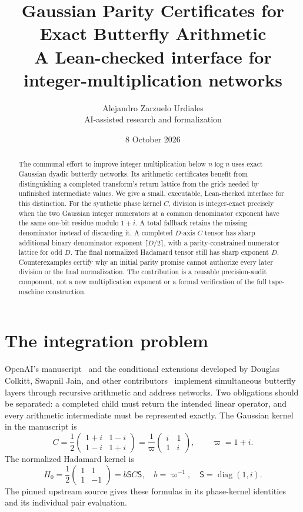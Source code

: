 \documentclass[11pt]{article}
\title{Gaussian Parity Certificates for Exact Butterfly Arithmetic\\
\large A Lean-checked interface for integer-multiplication networks}
\author{Alejandro Zarzuelo Urdiales\\\small AI-assisted research and formalization}
\date{8 October 2026}
\theoremstyle{definition}\newtheorem{definition}[theorem]{Definition}
\theoremstyle{remark}\newtheorem{remark}[theorem]{Remark}
\newcommand{\p}{\varpi}
\begin{document}
\maketitle
\begin{abstract}
The communal effort to improve integer multiplication below $n\log n$ uses exact Gaussian dyadic butterfly networks. Its arithmetic certificates benefit from distinguishing a completed transform's return lattice from the grids needed by unfinished intermediate values. We give a small, executable, Lean-checked interface for this distinction. For the synthetic phase kernel $C$, division is integer-exact precisely when the two Gaussian integer numerators at a common denominator exponent have the same one-bit residue modulo $1+i$. A total fallback retains the missing denominator instead of discarding it. A completed $D$-axis $C$ tensor has sharp additional binary denominator exponent $\lceil D/2\rceil$, with a parity-constrained numerator lattice for odd $D$. The final normalized Hadamard tensor still has sharp exponent $D$. Counterexamples certify why an initial parity promise cannot authorize every later division or the final normalization. The contribution is a reusable precision-audit component, not a new multiplication exponent or a formal verification of the full tape-machine construction.
\end{abstract}

\section{The integration problem}
OpenAI's manuscript~\cite{openai} and the conditional extensions developed by Douglas Colkitt, Swapnil Jain, and other contributors~\cite{colkitt,jain,chen} implement simultaneous butterfly layers through recursive arithmetic and address networks. Two obligations should be separated: a completed child must return the intended linear operator, and every arithmetic intermediate must be represented exactly. The Gaussian kernel in the manuscript is
\begin{equation}\label{eq:C}
 C=\frac12\begin{pmatrix}1+i&1-i\\1-i&1+i\end{pmatrix}
   =\frac1\p\begin{pmatrix}i&1\\1&i\end{pmatrix},\qquad \p=1+i.
\end{equation}
The normalized Hadamard kernel is
\begin{equation}\label{eq:H}
 H_0=\frac12\begin{pmatrix}1&1\\1&-1\end{pmatrix}
     =b\mathsf S C\mathsf S,\quad b=\p^{-1},\quad\mathsf S=\operatorname{diag}(1,i).
\end{equation}
The pinned upstream source gives these formulas in its phase-kernel identities and its individual pair evaluation.
\end{document}
